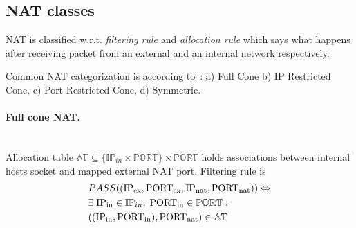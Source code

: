\documentclass[twoside]{article}
\begin{document}
\begin{multicols}{2}
% 
% 

\subsection{NAT classes}
NAT is classified w.r.t. \emph{filtering rule} and \emph{allocation rule} which says what happens after receiving
packet from an external and an internal network respectively.

Common NAT categorization is according to~\citep{rfc3489}: a) Full Cone
b) IP Restricted Cone, c) Port Restricted Cone, d) Symmetric.

\paragraph{Full cone NAT.} ~\\
Allocation table $\mathbb{AT} \subseteq \{ \mathbb{IP}_{in} \times \mathbb{PORT} \} \times \mathbb{PORT}$ holds associations between internal 
hosts socket and mapped external NAT port. 
Filtering rule is
\begin{align*}
& PASS((\text{IP\textsubscript{ex}}, \text{PORT\textsubscript{ex}}, \text{IP\textsubscript{nat}}, \text{PORT\textsubscript{nat}} )) \Leftrightarrow \\
&  \exists \; \text{IP\textsubscript{in}} \in \mathbb{IP}_{in}, \; \text{PORT\textsubscript{in}} \in \mathbb{PORT}:\\
& ((\text{IP\textsubscript{in}}, \text{PORT\textsubscript{in}}), \text{PORT\textsubscript{nat}} ) \in \mathbb{AT}
\end{align*}
 

\end{multicols}
\end{document}

